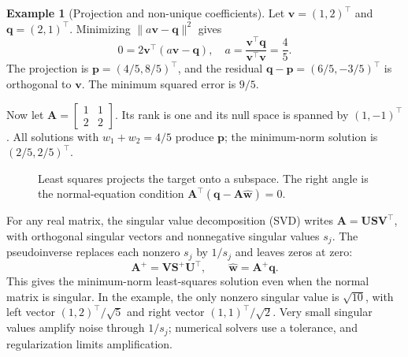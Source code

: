 \documentclass[11pt,twoside]{article}
\numberwithin{equation}{section}
\newcommand{\vect}[1]{\bm{#1}}
\newcommand{\mat}[1]{\bm{#1}}
\theoremstyle{plain}
\theoremstyle{definition}
\newtheorem{example}[theorem]{Example}
\theoremstyle{remark}
\begin{document}
\begin{example}[Projection and non-unique coefficients]
Let $\vect v=(1,2)^\top$ and $\vect q=(2,1)^\top$. Minimizing $\|a\vect v-\vect q\|^2$ gives
\[
0=2\vect v^\top(a\vect v-\vect q),\quad
 a=\frac{\vect v^\top\vect q}{\vect v^\top\vect v}=\frac45.
\]
The projection is $\vect p=(4/5,8/5)^\top$, and the residual $\vect q-\vect p=(6/5,-3/5)^\top$ is orthogonal to $\vect v$. The minimum squared error is $9/5$.

Now let $\mat A=\left[\begin{smallmatrix}1&1\\2&2\end{smallmatrix}\right]$. Its rank is one and its null space is spanned by $(1,-1)^\top$. All solutions with $w_1+w_2=4/5$ produce $\vect p$; the minimum-norm solution is $(2/5,2/5)^\top$.
\end{example}

\begin{figure}[H]
\centering
{}
\caption{Least squares projects the target onto a subspace. The right angle is the normal-equation condition $\mat A^\top(\vect q-\mat A\hat{\vect w})=0$.}
\end{figure}

For any real matrix, the singular value decomposition (SVD) writes $\mat A=\mat U\mat S\mat V^\top$, with orthogonal singular vectors and nonnegative singular values $s_j$. The pseudoinverse replaces each nonzero $s_j$ by $1/s_j$ and leaves zeros at zero:
\[
\mat A^+=\mat V\mat S^+\mat U^\top,\qquad
\hat{\vect w}=\mat A^+\vect q.
\]
This gives the minimum-norm least-squares solution even when the normal matrix is singular. In the example, the only nonzero singular value is $\sqrt{10}$, with left vector $(1,2)^\top/\sqrt5$ and right vector $(1,1)^\top/\sqrt2$. Very small singular values amplify noise through $1/s_j$; numerical solvers use a tolerance, and regularization limits amplification.
\end{document}
